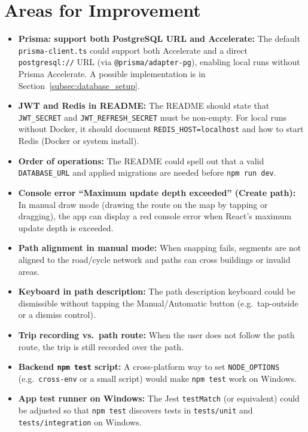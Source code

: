 \section{Areas for Improvement}
\label{sec:areas_for_improvement}
\begin{itemize}
    \item \textbf{Prisma: support both PostgreSQL URL and Accelerate:} The default \texttt{prisma-client.ts} could support both Accelerate and a direct \texttt{postgresql://} URL (via \texttt{@prisma/adapter-pg}), enabling local runs without Prisma Accelerate. A possible implementation is in Section~\ref{subsec:database_setup}.
    \item \textbf{JWT and Redis in README:} The README should state that \texttt{JWT\_SECRET} and \texttt{JWT\_REFRESH\_SECRET} must be non-empty. For local runs without Docker, it should document \texttt{REDIS\_HOST=localhost} and how to start Redis (Docker or system install).
    \item \textbf{Order of operations:} The README could spell out that a valid \texttt{DATABASE\_URL} and applied migrations are needed before \texttt{npm run dev}.
    \item \textbf{Console error ``Maximum update depth exceeded'' (Create path):} In manual draw mode (drawing the route on the map by tapping or dragging), the app can display a red console error when React's maximum update depth is exceeded.
    \item \textbf{Path alignment in manual mode:} When snapping fails, segments are not aligned to the road/cycle network and paths can cross buildings or invalid areas.
    \item \textbf{Keyboard in path description:} The path description keyboard could be dismissible without tapping the Manual/Automatic button (e.g.\ tap-outside or a dismiss control).
    \item \textbf{Trip recording vs.\ path route:} When the user does not follow the path route, the trip is still recorded over the path.
    \item \textbf{Backend \texttt{npm test} script:} A cross-platform way to set \texttt{NODE\_OPTIONS} (e.g.\ \texttt{cross-env} or a small script) would make \texttt{npm test} work on Windows.
    \item \textbf{App test runner on Windows:} The Jest \texttt{testMatch} (or equivalent) could be adjusted so that \texttt{npm test} discovers tests in \texttt{tests/unit} and \texttt{tests/integration} on Windows.
\end{itemize}
